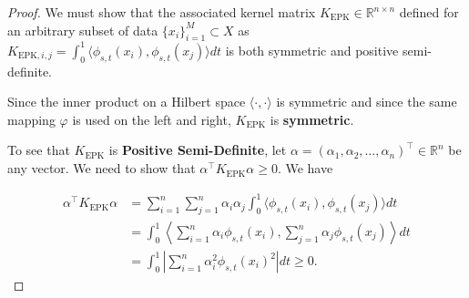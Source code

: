 \begin{proof}
We must show that the associated kernel matrix $K_{\text{EPK}} \in \mathbb{R}^{n\times n}$ defined for an arbitrary subset of data $\{x_i\}_{i=1}^M \subset X$ as $K_{\text{EPK},i,j} = \int_0^1\langle \phi_{s,t}(x_i), \phi_{s,t}(x_j)\rangle dt$ is both symmetric and positive semi-definite.

Since the inner product on a Hilbert space $\langle \cdot, \cdot \rangle$ is symmetric and since the same mapping $\varphi$ is used on the left and right, $K_{\text{EPK}}$ is \textbf{symmetric}. 

To see that $K_{\text{EPK}}$ is \textbf{Positive Semi-Definite}, let $\alpha = (\alpha_1, \alpha_2, \dots, \alpha_n)^\top \in \mathbb{R}^n$ be any vector. We need to show that $\alpha^\top K_{\text{EPK}} \alpha \geq 0$. We have

\begin{align}
\alpha^\top K_{\text{EPK}} \alpha &= \sum_{i=1}^n \sum_{j=1}^n \alpha_i \alpha_j \int_0^1 \langle \phi_{s,t}(x_i), \phi_{s,t}(x_j)\rangle dt \\
&=   \int_0^1 \left\langle \sum_{i=1}^n \alpha_i \phi_{s,t}(x_i), \sum_{j=1}^n \alpha_j \phi_{s,t}(x_j)\right\rangle dt \\
&=   \int_0^1 \left\lvert \sum_{i=1}^n \alpha_i^2 \phi_{s,t}(x_i)^2\right\rvert dt 
\geq 0.
\end{align}
\end{proof}

